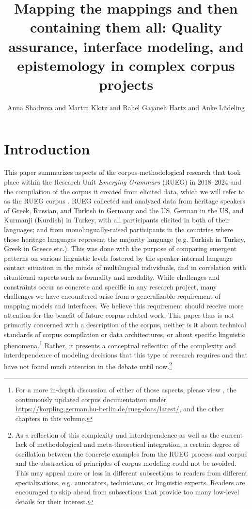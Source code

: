 \documentclass[output=paper,colorlinks,citecolor=brown]{langscibook}
\author{Anna Shadrova\orcid{0000-0001-6455-2427}\affiliation{Humboldt-Universität zu Berlin} and Martin Klotz\orcid{0000-0002-8078-4516}\affiliation{Humboldt-Universität zu Berlin} and Rahel Gajaneh Hartz\orcid{0009-0006-4264-7728}\affiliation{Humboldt-Universität zu Berlin} and Anke Lüdeling\orcid{0000-0001-5944-4595}\affiliation{Humboldt-Universität zu Berlin}}
\title[Mapping the mappings and then containing them all]{Mapping the mappings and then containing them all: Quality assurance, interface modeling, and epistemology in complex corpus projects}
\begin{document}
\maketitle

\section{Introduction}

This paper summarizes aspects of the corpus-methodological research that took place within the Research Unit \textit{Emerging Grammars} (RUEG) in 2018--2024 and the compilation of the corpus it created from elicited data, which we will refer to as the RUEG corpus \parencite{RUEGcorpus2024, Klotzetal2024}. RUEG collected and analyzed data from heritage speakers of Greek, Russian, and Turkish in Germany and the US, German in the US, and Kurmanji (Kurdish) in Turkey, with all participants elicited in both of their languages; and from monolingually-raised participants in the countries where those  heritage languages represent the majority language (e.g. Turkish in Turkey, Greek in Greece etc.). This was done with the purpose of comparing emergent patterns on various linguistic levels fostered by the speaker-internal language contact situation in the minds of multilingual individuals, and in correlation with situational aspects such as formality and modality. While challenges and constraints occur as concrete and specific in any research project, many challenges we have encountered arise from a generalizable requirement of mapping models and interfaces. We believe this requirement should receive more attention for the benefit of future corpus-related work. This paper thus is not primarily concerned with a description of the corpus, neither is it about technical standards of corpus compilation or data architectures, or about specific linguistic phenomena.\footnote{For a more in-depth discussion of either of those aspects, please view \textcite{Wiese2020}, the continuously updated corpus documentation under \url{https://korpling.german.hu-berlin.de/rueg-docs/latest/}, and the other chapters in this volume.} Rather, it presents a conceptual reflection of the complexity and interdependence of modeling decisions that this type of research requires and that have not found much attention in the debate until now.\footnote{As a reflection of this complexity and interdependence as well as the current lack of methodological and meta-theoretical integration, a certain degree of oscillation between the concrete examples from the RUEG process and corpus and the abstraction of principles of corpus modeling could not be avoided. This may appeal more or less in different subsections to readers from different specializations, e.g. annotators, technicians, or linguistic experts. Readers are encouraged to skip ahead from subsections that provide too many low-level details for their interest.}
\end{document}
